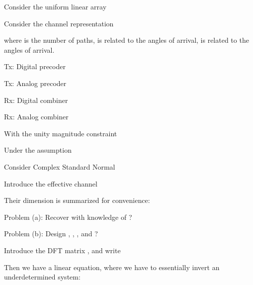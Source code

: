 {
\I Consider the uniform linear array

\I Consider the channel representation

\I where  is the number of paths,  is related to the angles of arrival,  is related to the angles of arrival.
}
{
\I Tx: Digital precoder 

\I Tx: Analog precoder 

\I Rx: Digital combiner 

\I Rx: Analog combiner 

\I With the unity magnitude constraint

\I Under the assumption
}
{
\I Consider Complex Standard Normal 

\I Introduce the effective channel

\I Their dimension is summarized for convenience:

\I Problem (a): Recover  with knowledge of ?

\I Problem (b): Design , , , and ?
}
{
\I Introduce the DFT matrix , and write

\I Then we have a linear equation, where we have to essentially invert an underdetermined system:
}
